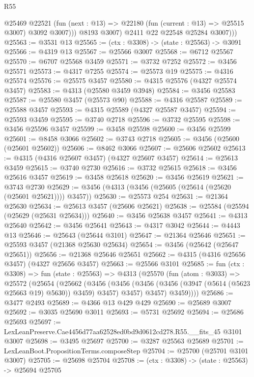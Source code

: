 \begin{lexlean}{R55}
\begin{coremodule}
                @25469
                @22521
                (fun (next : @13) => @22180 (fun (current : @13) => @25515 @3007) @3092 @3007)))
            @8193
            @3007)
          @2411
          @22
          @22548
          @25284
          @3007)))
@25563 := @3531 @13
@25565 := (ctx : @3308) -> (state : @25563) -> @3091
@25566 := @4319 @13
@25567 := @25566 @3007
@25568 := @6712 @25567
@25570 := @6707 @25568 @3459
@25571 := @3732 @7252
@25572 := @3456 @25571
@25573 := @4317 @7255
@25574 := @25573 @19
@25575 := @4316 @25574
@25576 := @25575 @3457
@25580 := @4315 @25576 (@4327 @25574 @3457)
@25583 := @4313 (@25580 @3459 @3948)
@25584 := @3456 @25583
@25587 := @25580 @3457 (@25573 @90)
@25588 := @4316 @25587
@25589 := @25588 @3457
@25593 := @4315 @25589 (@4327 @25587 @3457)
@25594 := @25593 @3459
@25595 := @3740 @2718
@25596 := @3732 @25595
@25598 := @3456 @25596 @3457
@25599 := @3458 @25598
@25600 := @3456 @25599
@25601 := @8458 @3066
@25602 := @3743 @2718
@25605 := @3456 (@25600 (@25601 @25602))
@25606 := @8462 @3066
@25607 := @25606 @25602
@25613 := @4315 (@4316 @25607 @3457) (@4327 @25607 @3457)
@25614 := @25613 @3459
@25615 := @3740 @2730
@25616 := @3732 @25615
@25618 := @3456 @25616 @3457
@25619 := @3458 @25618
@25620 := @3456 @25619
@25621 := @3743 @2730
@25629 := @3456 (@4313 (@3456 (@25605 (@25614 (@25620 (@25601 @25621)))) @3457))
@25630 := @25573 @254
@25631 := @21364 @25630
@25634 := @25613 @3457 (@25606 @25621)
@25638 := @25584 (@25594 (@25629 (@25631 @25634)))
@25640 := @3456 @25638 @3457
@25641 := @4313 @25640
@25642 := @3456 @25641
@25643 := @4317 @3042
@25644 := @4443 @13
@25646 := @25643 (@25644 @3101)
@25647 := @21364 @25646
@25651 := @25593 @3457 (@21368 @25630 @25634)
@25654 := @3456 (@25642 (@25647 @25651))
@25656 := @21368 @25646 @25651
@25662 := @4315 (@4316 @25656 @3457) (@4327 @25656 @3457)
@25663 := @25566 @3101
@25685 := fun (ctx : @3308) =>
  fun (state : @25563) =>
  @4313
    (@25570
      (fun (atom : @3033) =>
      @25572
        (@25654
          (@25662
            (@3456
              (@3456 (@3456 (@3456 (@3947 (@5614 (@5623 @25663 @19) @5630)) @3459) @3457) @3457)
              @3457)
            @3459))))
@25686 := @3477 @2493
@25689 := @4366 @13 @429 @429
@25690 := @25689 @3007
@25692 := @3035 @25690 @3011
@25693 := @5731 @25692
@25694 := @25686 @25693
@25697 := LexLeanPreserve.Cae4456d77aa62528ed0bd9d0612cd278.R55.__fits_45 @3101 @3007
@25698 := @3495 @25697
@25700 := @3287 @25563 @25689
@25701 := LexLeanBoot.PropositionTerms.composeStep
@25704 := @25700 (@25701 @3101 @3007)
@25705 := @25698 @25704
@25708 := (ctx : @3308) -> (state : @25563) -> @25694 @25705

\end{coremodule}
\end{lexlean}
